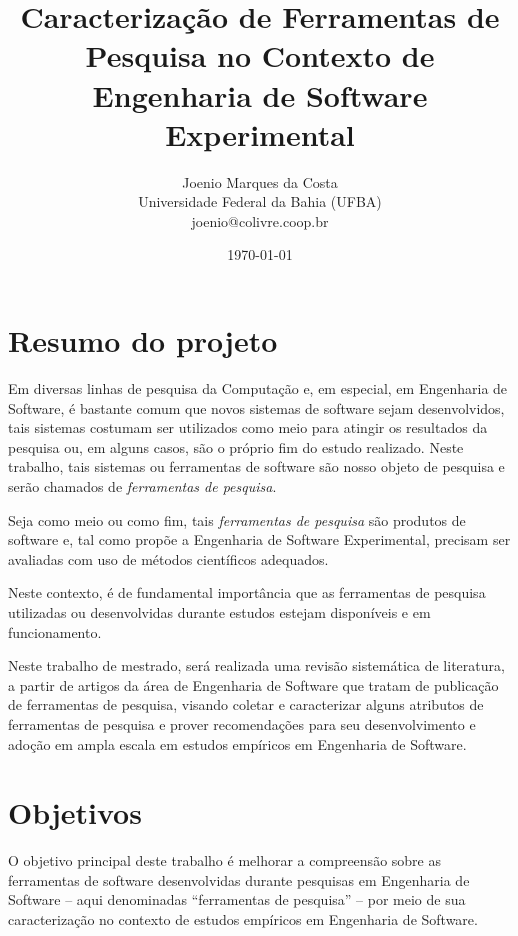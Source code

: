 \documentclass[12pt]{article}
\title{
  Caracterização de Ferramentas de Pesquisa no Contexto de Engenharia de
  Software Experimental
}
\author{Joenio Marques da Costa\\
  {\small Universidade Federal da Bahia (UFBA)} \\
  {\small joenio@colivre.coop.br}
}
\date{\today}
\begin{document}
\maketitle

\section{Resumo do projeto}

Em diversas linhas de pesquisa da Computação e, em especial, em Engenharia de
Software, é bastante comum que novos sistemas de software sejam desenvolvidos,
tais sistemas costumam ser utilizados como meio para atingir os resultados da
pesquisa ou, em alguns casos, são o próprio fim do estudo realizado. Neste
trabalho, tais sistemas ou ferramentas de software são nosso objeto de
pesquisa e serão chamados de {\it ferramentas de pesquisa}.

Seja como meio ou como fim, tais {\it ferramentas de pesquisa} são produtos de
software e, tal como propõe a Engenharia de Software Experimental, precisam
ser avaliadas com uso de métodos científicos adequados.

Neste contexto, é de fundamental importância
que as ferramentas de pesquisa utilizadas ou desenvolvidas durante estudos
estejam disponíveis e em funcionamento.


Neste trabalho de mestrado, será realizada uma revisão sistemática de
literatura, a partir de artigos da área de Engenharia de Software que tratam
de publicação de ferramentas de pesquisa, visando coletar e caracterizar
alguns atributos de ferramentas de pesquisa e prover recomendações para seu
desenvolvimento e adoção em ampla escala em estudos empíricos em Engenharia de
Software.

\section{Objetivos}

O objetivo principal deste trabalho é melhorar a compreensão sobre as
ferramentas de software desenvolvidas durante pesquisas em Engenharia de
Software -- aqui denominadas “ferramentas de pesquisa” -- por meio de sua
caracterização no contexto de estudos empíricos em Engenharia de Software. 
\end{document}
